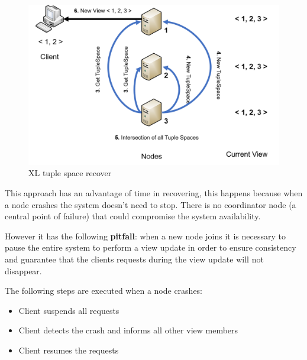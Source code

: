 \documentclass[times, 10pt,twocolumn]{article}
\begin{document}
\begin{figure}
   \includegraphics[width=\linewidth]{xl_join2.png}
   \caption{XL tuple space recover}
   \label{fig:xl_join2}
 \end{figure}


This approach has an advantage of time in recovering, this happens because when
a node crashes the system doesn't need to stop. There is no coordinator node
(a central point of failure) that could compromise the system availability.


However it has the following \textbf{pitfall}: when a new node joins it is necessary
to pause the entire system to perform a view update in order to ensure consistency
and guarantee that the clients requests during the view update will not disappear.

The following steps are executed when a node crashes:
\begin{itemize}
   \item Client suspends all requests
   \item Client detects the crash and informs all other view members
   \item Client resumes the requests
\end{itemize}
\end{document}
